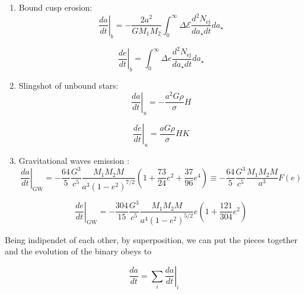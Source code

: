 \begin{enumerate}
    \item Bound cusp erosion:
    \begin{equation}\label{Sesana_2010 da/dt BOUND}
    \left.\frac{da}{dt}\right|_{b} = -\frac{2a^2}{G M_1 M_2} \int_0^\infty \Delta \mathcal{E}\frac{d^2 N_{\mathrm{ej}}}{da_\star dt} da_\star
\end{equation}

\begin{equation}\label{Sesana_2010 de/dt BOUND}
    \left.\frac{de}{dt}\right|_{b}= \int_0^\infty \Delta e \frac{d^2 N_{\mathrm{ej}}}{da_\star dt} da_\star
\end{equation}
    
\item   Slingshot of unbound stars:
\begin{equation}
    \left.\frac{da}{dt}\right|_{u} = -\frac{a^2 G \rho}{\sigma} H
\end{equation}

\begin{equation}
    \left.\frac{de}{dt}\right|_{u} = \frac{a G \rho}{\sigma} H K
\end{equation}

\item Gravitational waves emission \cite{Peters_1963}:
\begin{equation}
    \left.\frac{da}{dt}\right|_{\mathrm{GW}} = -\frac{64}{5} \frac{G^3}{c^5} \frac{M_1 M_2 M}{a^3 (1 - e^2)^{7/2}} \left( 1 + \frac{73}{24} e^2 + \frac{37}{96} e^4 \right)\equiv -\frac{64}{5} \frac{G^3}{c^5} \frac{M_1 M_2 M}{a^3}F(e)
\end{equation}


\begin{equation}
    \left.\frac{de}{dt}\right|_{\mathrm{GW}} = -\frac{304}{15} \frac{G^3}{c^5} \frac{M_1 M_2 M}{a^4 (1 - e^2)^{5/2}} e \left( 1 + \frac{121}{304} e^2 \right)
\end{equation}

\end{enumerate}
Being indipendet of each other, by superposition, we can put
the pieces together and the evolution of the binary obeys to


\begin{equation}\label{Sesana_2010 da/dt TOT}
    \frac{da}{dt} = \sum_i \left.\frac{da}{dt}\right|_i
\end{equation}


